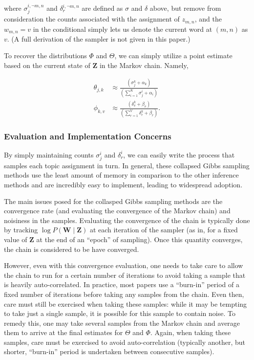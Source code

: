 \documentclass[11pt]{article}
\begin{document}
where $\sigma_j^{i,\neg m,n}$ and $\delta_r^{i,\neg m,n}$ are defined as
$\sigma$ and $\delta$ above, but remove from consideration the counts
associated with the assignment of $z_{m,n}$, and the $w_{m,n} = v$ in the
conditional simply lets us denote the current word at $(m,n)$ as $v$. (A
full derivation of the sampler is not given in this paper.)

To recover the distributions $\Phi$ and $\Theta$, we can simply utilize a
point estimate based on the current state of $\mathbf{Z}$ in the Markov
chain. Namely,

\begin{align}
  \theta_{j,k}
  &\approx
  \frac{(\sigma_j^k + \alpha_k)}
  {\left(\sum_{i=1}^K \sigma_j^i + \alpha_i\right)}\\
  \phi_{k,v}
  &\approx
  \frac{(\delta_v^k + \beta_v)}
  {\left(\sum_{r=1}^V \delta_r^k + \beta_r\right)}.
\end{align}

\subsubsection{Evaluation and Implementation Concerns}

By simply maintaining counts $\sigma_j^i$ and $\delta_r^i$, we can
easily write the process that samples each topic assignment in turn. In
general, these collapsed Gibbs sampling methods use the least amount of
memory in comparison to the other inference methods and are incredibly easy
to implement, leading to widespread adoption.

The main issues posed for the collasped Gibbs sampling methods are the
convergence rate (and evaluating the convergence of the Markov chain) and
noisiness in the samples. Evaluating the convergence of the chain is
typically done by tracking $\log P(\mathbf{W} \mid \mathbf{Z})$ at each
iteration of the sampler (as in, for a fixed value of $\mathbf{Z}$ at the
end of an ``epoch'' of sampling). Once this quantity converges, the chain
is considered to be have converged.

However, even with this convergence evaluation, one needs to take care to
allow the chain to run for a certain number of iterations to avoid taking a
sample that is heavily auto-correlated. In practice, most papers use a
``burn-in'' period of a fixed number of iterations before taking any
samples from the chain. Even then, care must still be exercised when taking
these samples: while it may be tempting to take just a single sample, it is
possible for this sample to contain noise. To remedy this, one may take
several samples from the Markov chain and average them to arrive at the
final estimates for $\Theta$ and $\Phi$. Again, when taking these samples,
care must be exercised to avoid auto-correlation (typically another, but
shorter, ``burn-in'' period is undertaken between consecutive samples).
\end{document}
